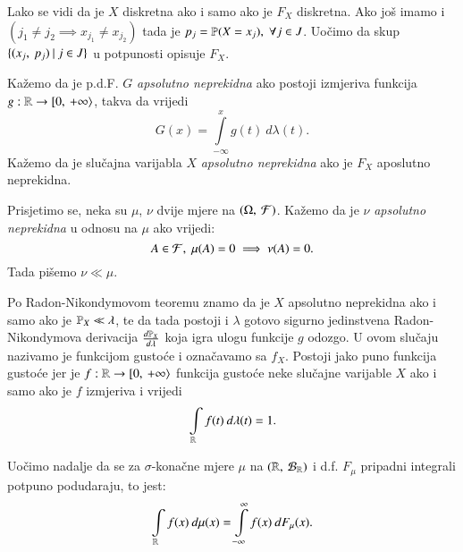 Lako se vidi da je $X$ diskretna ako i samo ako je $F_X$ diskretna.
Ako jo\v s imamo i $(j_1 \neq j_2 \implies x_{j_1} \neq x_{j_2})$ tada je $p_j = \mathbb{P}({X = x_j}), \; \forall j \in J$.
Uo\v cimo da skup $\{{({x_j}, \: {p_j})} \: | \: {j \in J}\}$ u potpunosti opisuje $F_X$.

\begin{defn}    \label{defn:5.11-2}
Ka\v zemo da je p.d.F. $G$ \emph{apsolutno neprekidna} ako postoji izmjeriva funkcija $g : \mathbb{R} \to [ {0}, \: {+\infty} \rangle$, takva da vrijedi
\begin{equation*}
    G(x) = \int\limits_{-\infty}^{x} g(t) \: d \lambda (t).
\end{equation*}
Ka\v zemo da je slu\v cajna varijabla $X$ \emph{apsolutno neprekidna} ako je $F_X$ aposlutno neprekidna.
\end{defn}

\begin{nap} \label{nap:5.11-3}
    Prisjetimo se, neka su $\mu$, $\nu$ dvije mjere na $(\Omega, \: \mathcal{F})$. Ka\v zemo da je $\nu$ \emph{apsolutno neprekidna} u odnosu na $\mu$ ako vrijedi:
    \begin{equation*}
        A \in \mathcal{F}, \; \mu(A) = 0 \implies \nu (A) = 0.
    \end{equation*}
    Tada pi\v semo $\nu \ll \mu$.
\end{nap}

Po Radon-Nikondymovom teoremu znamo da je $X$ apsolutno neprekidna ako i samo ako je $\mathbb{P}_X \ll \lambda$, te da tada postoji i $\lambda$ gotovo sigurno jedinstvena Radon-Nikondymova derivacija $\frac{d \mathbb{P}_X}{d \lambda}$ koja igra ulogu funkcije $g$ odozgo.
U ovom slu\v caju nazivamo je funkcijom gusto\' ce i ozna\v cavamo sa $f_X$.
Postoji jako puno funkcija gusto\' ce jer je $f: \mathbb{R} \to [ {0}, \: {+\infty} \rangle$ funkcija gusto\' ce neke slu\v cajne varijable $X$ ako i samo ako je $f$ izmjeriva i vrijedi
\begin{equation*}
    \int\limits_{\mathbb{R}} f(t) \: d \lambda (t) = 1.
\end{equation*}

Uo\v cimo nadalje da se za $\sigma$-kona\v cne mjere $\mu$ na $({\mathbb{R}}, \: {\mathcal{B}_{\mathbb{R}}})$ i d.f. $F_{\mu}$ pripadni integrali potpuno podudaraju, to jest:
\begin{equation*}
    \int\limits_{\mathbb{R}} f(x) \: d \mu (x) = \int\limits_{-\infty}^{\infty} f(x) \: d F_{\mu} (x).
\end{equation*}

